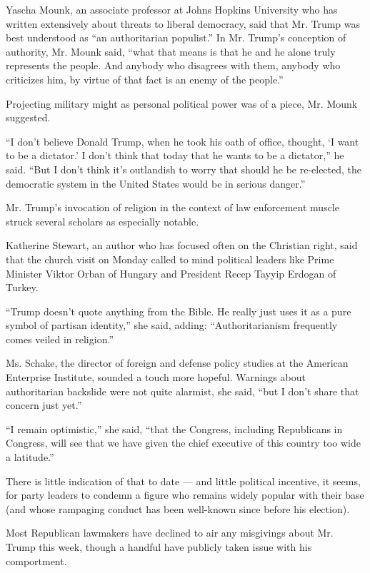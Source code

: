 Yascha Mounk, an associate professor at Johns Hopkins University who has
written extensively about threats to liberal democracy, said that Mr.
Trump was best understood as ``an authoritarian populist.'' In Mr.
Trump's conception of authority, Mr. Mounk said, ``what that means is
that he and he alone truly represents the people. And anybody who
disagrees with them, anybody who criticizes him, by virtue of that fact
is an enemy of the people.''

Projecting military might as personal political power was of a piece,
Mr. Mounk suggested.

``I don't believe Donald Trump, when he took his oath of office,
thought, `I want to be a dictator.' I don't think that today that he
wants to be a dictator,'' he said. ``But I don't think it's outlandish
to worry that should he be re-elected, the democratic system in the
United States would be in serious danger.''

Mr. Trump's invocation of religion in the context of law enforcement
muscle struck several scholars as especially notable.

Katherine Stewart, an author who has focused often on the Christian
right, said that the church visit on Monday called to mind political
leaders like Prime Minister Viktor Orban of Hungary and President Recep
Tayyip Erdogan of Turkey.

``Trump doesn't quote anything from the Bible. He really just uses it as
a pure symbol of partisan identity,'' she said, adding:
``Authoritarianism frequently comes veiled in religion.''

Ms. Schake, the director of foreign and defense policy studies at the
American Enterprise Institute, sounded a touch more hopeful. Warnings
about authoritarian backslide were not quite alarmist, she said, ``but I
don't share that concern just yet.''

``I remain optimistic,'' she said, ``that the Congress, including
Republicans in Congress, will see that we have given the chief executive
of this country too wide a latitude.''

There is little indication of that to date --- and little political
incentive, it seems, for party leaders to condemn a figure who remains
widely popular with their base (and whose rampaging conduct has been
well-known since before his election).

Most Republican lawmakers have declined to air any misgivings about Mr.
Trump this week, though a handful have publicly taken issue with his
comportment.

